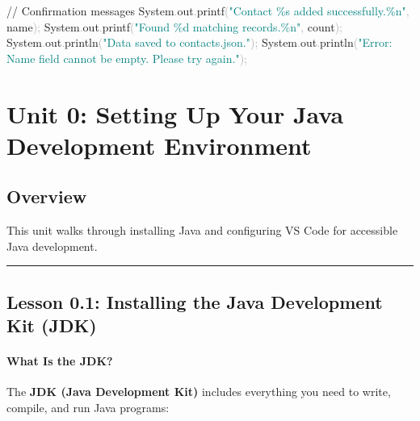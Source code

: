 \documentclass[
  justified,
  openright,
]{tufte-book}
\let\subsubsection\paragraph
\let\paragraph\paragraph
\newcommand{\BuiltInTok}[1]{#1}
\newcommand{\CommentTok}[1]{\textcolor{MidGray}{#1}}
\newcommand{\FunctionTok}[1]{\textcolor{BrandBlue}{#1}}
\newcommand{\NormalTok}[1]{#1}
\newcommand{\OperatorTok}[1]{\textcolor{DarkGray}{#1}}
\newcommand{\SpecialCharTok}[1]{\textcolor{Teal}{#1}}
\newcommand{\StringTok}[1]{\textcolor{Teal}{#1}}
\newenvironment{Shaded}{%
  \begin{snugshade}
}{%
  \end{snugshade}
}
\let\subsubsection\paragraph
\let\paragraph\paragraph
\begin{document}
\begin{Shaded}
\begin{Highlighting}[]
\CommentTok{// Confirmation messages}
\BuiltInTok{System}\OperatorTok{.}\FunctionTok{out}\OperatorTok{.}\FunctionTok{printf}\OperatorTok{(}\StringTok{"Contact \textquotesingle{}}\SpecialCharTok{\%s}\StringTok{\textquotesingle{} added successfully.}\SpecialCharTok{\%n}\StringTok{"}\OperatorTok{,}\NormalTok{ name}\OperatorTok{);}
\BuiltInTok{System}\OperatorTok{.}\FunctionTok{out}\OperatorTok{.}\FunctionTok{printf}\OperatorTok{(}\StringTok{"Found }\SpecialCharTok{\%d}\StringTok{ matching records.}\SpecialCharTok{\%n}\StringTok{"}\OperatorTok{,}\NormalTok{ count}\OperatorTok{);}
\BuiltInTok{System}\OperatorTok{.}\FunctionTok{out}\OperatorTok{.}\FunctionTok{println}\OperatorTok{(}\StringTok{"Data saved to contacts.json."}\OperatorTok{);}
\BuiltInTok{System}\OperatorTok{.}\FunctionTok{out}\OperatorTok{.}\FunctionTok{println}\OperatorTok{(}\StringTok{"Error: Name field cannot be empty. Please try again."}\OperatorTok{);}
\end{Highlighting}
\end{Shaded}

\newpage

\section{Unit 0: Setting Up Your Java Development
Environment}\label{unit-0-setting-up-your-java-development-environment}

\subsection{Overview}\label{overview}

This unit walks through installing Java and configuring VS Code for
accessible Java development.

\begin{center}\rule{0.5\linewidth}{0.5pt}\end{center}

\subsection{Lesson 0.1: Installing the Java Development Kit
(JDK)}\label{lesson-0.1-installing-the-java-development-kit-jdk}

\subsubsection{What Is the JDK?}\label{what-is-the-jdk}

The \textbf{JDK (Java Development Kit)} includes everything you need to
write, compile, and run Java programs:
\end{document}
